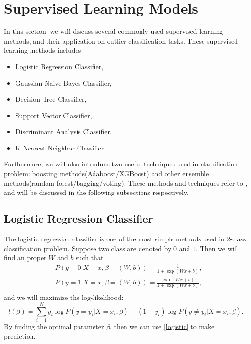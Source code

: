 \documentclass[english]{article}
\begin{document}
\section{Supervised Learning Models}
\par In this section, we will discuss several commonly used supervised learning methods, and their application on outlier classification tasks. These supervised learning methods includes
\begin{itemize}
	\item Logistic Regression Classifier,
	\item Gaussian Naive Bayes Classifier,
	\item Decision Tree Classifier,
	\item Support Vector Classifier,
	\item Discriminant Analysis Classifier,
	\item K-Nearest Neighbor Classifier.
\end{itemize}
\par Furthermore, we will also introduce two useful techniques used in classification problem: boosting methods(Adaboost/XGBoost) and other ensemble methods(random forest/bagging/voting). These methods and techniques refer to \cite{scikit-learn}\cite{friedman2001elements}, and will be discussed in the following subsections respectively.

\subsection{Logistic Regression Classifier}
\par The logistic regression classifier is one of the most simple methods used in 2-class classification problem. Suppose two class are denoted by $0$ and $1$. Then we will find an proper $W$ and $b$ such that
\begin{equation}\label{logistic}
	\begin{aligned}
		&P(y=0|X=x, \beta=(W, b)) = \frac{1}{1 + \exp(Wx+b)},\\
		&P(y=1|X=x, \beta=(W, b)) = \frac{\exp(Wx+b)}{1 + \exp(Wx+b)},\\
	\end{aligned}
\end{equation}
and we will maximize the log-likelihood:
\begin{equation}
	l(\beta) = \sum_{i=1}^{N}y_{i}\log P(y=y_{i}|X=x_{i}, \beta) + (1-y_{i})\log P(y\neq y_{i}|X=x_{i}, \beta).
\end{equation}
By finding the optimal parameter $\beta$, then we can use \eqref{logistic} to make prediction.
\end{document}

